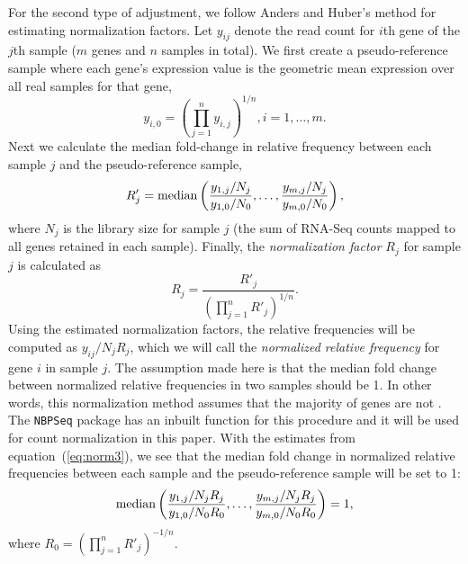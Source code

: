 For the second type of adjustment, we follow Anders and Huber's method
\citep{anders2010differential} for 
estimating normalization factors.  Let $y_{ij}$ denote the read count
for $i$th gene of the $j$th sample ($m$ genes and $n$ samples in total). We first
create a pseudo-reference sample where each gene's expression value is the 
geometric mean expression over all real samples for that gene,
\begin{equation}
y_{i,0} = (\prod_{j=1}^ny_{i,j})^{1/n},  i=1, \ldots, m. 
\end{equation} 
Next we calculate the median fold-change in relative frequency between
each sample $j$ and the pseudo-reference sample,
\begin{equation}\label{eq:normfactors} 
R'_j = \operatorname{median} \left(\dfrac{y_{1,j}/N_j}{y_{1,0}/N_{0}}, \ldots, 
\dfrac{y_{m,j}/N_j}{y_{m,0}/N_{0}}\right),
\end{equation}
where $N_j$ is the library size for sample $j$ (the sum of RNA-Seq
counts mapped to all genes retained in each sample). Finally, the
\textit{normalization factor}  $R_j$ for sample $j$ is calculated as 
\begin{equation}
\label{eq:norm3}
R_j = \dfrac{R'_j}{(\prod_{j=1}^{n}R'_j)^{1/n}}.
\end{equation}
Using the estimated normalization factors, the relative frequencies will be
computed as $y_{ij}/{N_j R_j}$, which we will call the \textit{normalized relative frequency}
for gene $i$ in sample $j$. The assumption made here is that the
median fold change between normalized relative frequencies in two samples should be 1. In
other words, this normalization method assumes that the majority of genes are
not \DED. The \verb|NBPSeq| package \citep{di2014package} has an inbuilt function for
this procedure and it will be used for count normalization in this paper. With
the estimates from equation~(\ref{eq:norm3}), we see that the median fold
change in normalized relative frequencies between each sample and the pseudo-reference
sample will be set to 1:
\begin{equation}
\label{eq:medianfc}
\operatorname{median} \left(\dfrac{y_{1,j}/ N_jR_j}{y_{1,0}/N_{0}R_0}, \ldots,
\dfrac{y_{m,j}/N_j R_j}{y_{m,0}/N_{0}R_0} \right) = 1,
\end{equation}
where $R_0 = (\prod_{j=1}^{n}R'_j)^{-1/n}$.


